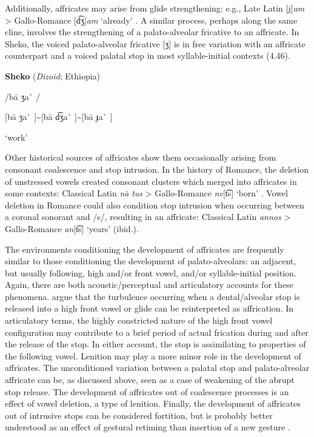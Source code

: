   Additionally, affricates may arise from glide strengthening: e.g., Late Latin [j]\textit{am} > Gallo-Romance [d͡ʒ]\textit{am} ‘already’ \citep[132]{Berns2013}. A similar process, perhaps along the same cline, involves the strengthening of a palato-alveolar fricative to an affricate. In Sheko, the voiced palato-alveolar fricative [ʒ] is in free variation with an affricate counterpart and a voiced palatal stop in most syllable-initial contexts (4.46).



\ea\label{ex:(4.46)}
  \textbf{Sheko} (\textit{Dizoid}; Ethiopia)



/ba\={} ʒa\`{} /



[ba\={} ʒa\`{} ]{\textasciitilde}[ba\={} d͡ʒa\`{} ]{\textasciitilde}[ba\={} ɟa\`{} ]



‘work’



\citep[86]{Hellenthal2010}

\z


  Other historical sources of affricates show them occasionally arising from consonant coalescence and stop intrusion. In the history of Romance, the deletion of unstressed vowels created consonant clusters which merged into affricates in some contexts: Classical Latin \textit{na}\textsf{\={} }\textit{tus} > Gallo-Romance \textit{ne}[t͡s] ‘born’ \citep[128]{Berns2013}. Vowel deletion in Romance could also condition stop intrusion when occurring between a coronal sonorant and /s/, resulting in an affricate: Classical Latin \textit{annos} > Gallo-Romance \textit{an}[t͡s] ‘years’ (ibid.).



  The environments conditioning the development of affricates are frequently similar to those conditioning the development of palato-alveolars: an adjacent, but usually following, high and/or front vowel, and/or syllable-initial position. Again, there are both acoustic/perceptual and articulatory accounts for these phenomena. \citet{HallEtAl2006} argue that the turbulence occurring when a dental/alveolar stop is released into a high front vowel or glide can be reinterpreted as affrication. In articulatory terms, the highly constricted nature of the high front vowel configuration may contribute to a brief period of actual frication during and after the release of the stop. In either account, the stop is assimilating to properties of the following vowel. Lenition may play a more minor role in the development of affricates. The unconditioned variation between a palatal stop and palato-alveolar affricate can be, as discussed above, seen as a case of weakening of the abrupt stop release. The development of affricates out of coalescence processes is an effect of vowel deletion, a type of lenition. Finally, the development of affricates out of intrusive stops can be considered fortition, but is probably better understood as an effect of gestural retiming than insertion of a new gesture \citep[43-44]{Bybee2015b}.


